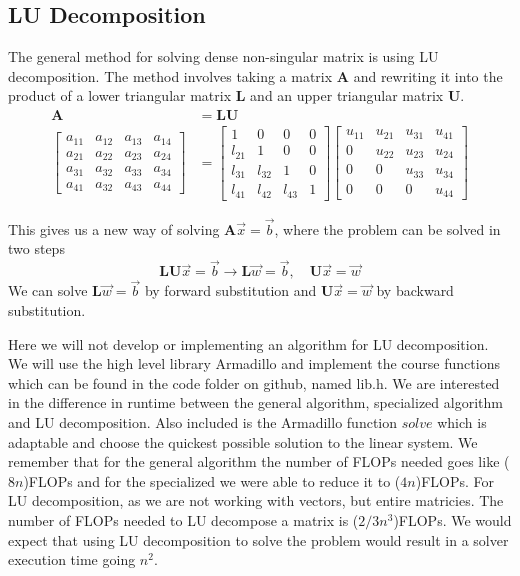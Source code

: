 \documentclass[10pt, a4paper]{amsart}
\begin{document}
\subsection{LU Decomposition}
The general method for solving dense non-singular matrix is using LU decomposition. The method involves taking a matrix $\mathbf{A}$ and rewriting it into the product of a lower triangular matrix $\mathbf{L}$ and an upper triangular matrix $\mathbf{U}$. 
\begin{align*}
\mathbf{A} &= \mathbf{L}\mathbf{U}\\
\begin{bmatrix}
	a_{11} & a_{12} & a_{13} & a_{14} \\
	a_{21} &a_{22} &a_{23} &a_{24} \\
	a_{31} &a_{32} &a_{33} &a_{34}  \\
	a_{41} &a_{32} &a_{43} &a_{44} 
\end{bmatrix}
&= 
\begin{bmatrix}
1& 0 & 0 & 0 \\
 l_{21}& 1& 0 & 0\\
 l_{31}&l_{32}&1& 0\\
 l_{41}&l_{42}&l_{43}&1
\end{bmatrix}
\begin{bmatrix}
u_{11}& u_{21}&u_{31}&u_{41}\\
0 & u_{22} & u_{23}& u_{24} \\
0 & 0 & u_{33}& u_{34}\\
0 & 0 & 0 & u_{44}
\end{bmatrix}
\end{align*}

This gives us a new way of solving $\mathbf{A}\vec{x}=\vec{b}$, where the problem can be solved in two steps 
\begin{equation}
\mathbf{L}\mathbf{U}\vec{x} = \vec{b} \rightarrow \mathbf{L}\vec{w} = \vec{b}, \quad \mathbf{U}\vec{x} = \vec{w}
\end{equation}
We can solve $\mathbf{L}\vec{w} = \vec{b}$ by forward substitution and $\mathbf{U}\vec{x} = \vec{w}$ by backward substitution. 

Here we will not develop or implementing an algorithm for LU decomposition. We will use the high level library Armadillo and implement the course functions which can be found in the code folder on github, named lib.h. We are interested in the difference in runtime between the general algorithm, specialized algorithm and LU decomposition. Also included is the Armadillo function $solve$ which is adaptable and choose the quickest possible solution to the linear system. We remember that for the general algorithm the number of FLOPs needed goes like ($8n$)FLOPs and for the specialized we were able to reduce it to ($4n$)FLOPs. For LU decomposition, as we are not working with vectors, but entire matricies. The number of FLOPs needed to LU decompose a matrix is ($2/3 n^3$)FLOPs\cite{morten}. We would expect that using LU decomposition to solve the problem would result in a solver execution time going $n^2$. 
\end{document}
